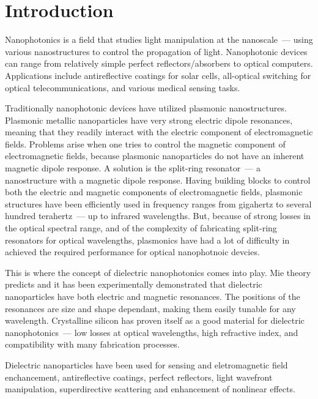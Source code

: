 \section*{Introduction}
\label{ch:Intro}
        Nanophotonics is a field that studies light manipulation at the nanoscale~--- using various nanostructures to control the
    propagation of light. Nanophotonic devices can range from relatively simple perfect reflectors/absorbers to optical computers.
    Applications include antireflective coatings for solar cells, all-optical switching for optical telecommunications, and various
    medical sensing tasks.

        Traditionally nanophotonic devices have utilized plasmonic nanostructures. Plasmonic metallic nanoparticles have very strong
    electric dipole resonances, meaning that they readily interact with the electric component of electromagnetic fields. Problems arise
    when one tries to control the magnetic component of electromagnetic fields, because plasmonic nanoparticles do not have an inherent
    magnetic dipole response. A solution is the split-ring resonator~--- a nanostructure with a magnetic dipole response. Having building
    blocks to control both the electric and magnetic components of electromagnetic fields, plasmonic structures have been efficiently
    used in frequency ranges from gigahertz to several hundred terahertz~--- up to infrared wavelengths. But, because of strong losses
    in the optical spectral range, and of the complexity of fabricating split-ring resonators for optical wavelengths, plasmonics have
    had a lot of difficulty in achieved the required performance for optical nanophotnoic devcies.\cite{krasnok2015towards}

        This is where the concept of dielectric nanophotonics comes into play. Mie theory predicts\cite{mie1908beitrage} and
    it has been experimentally demonstrated\cite{kuznetsov2012magnetic} that dielectric nanoparticles have both electric and
    magnetic resonances. The positions of the resonances are size and shape dependant, making them easily tunable for any wavelength.
    Crystalline silicon has proven itself as a good material for dielectric nanophotonics~--- low losses at optical wavelengths\cite{palik1998handbook},
    high refractive index, and compatibility with many fabrication processes\cite{popa2008compact,zhao2009mie,evlyukhin2010optical,garcia2011strong,
    krasnok2012all,ginn2012realizing,fu2012directional,krasnok2015towards}.

        Dielectric nanoparticles have been used for sensing and eletromagnetic field enchancement\cite{albella2013low,zambrana2015purcell,
    bakker2015magnetic,caldarola2015non}, antireflective coatings\cite{spinelli2012broadband},  perfect reflectors\cite{evlyukhin2010optical,
    moitra2014experimental}, light wavefront manipulation\cite{decker2015high,yu2015high}, superdirective scattering\cite{krasnok2014superdirective,
    krasnok2014experimental} and enhancement of nonlinear effects\cite{shcherbakov2014enhanced,makarov2015tuning}.

\clearpage
